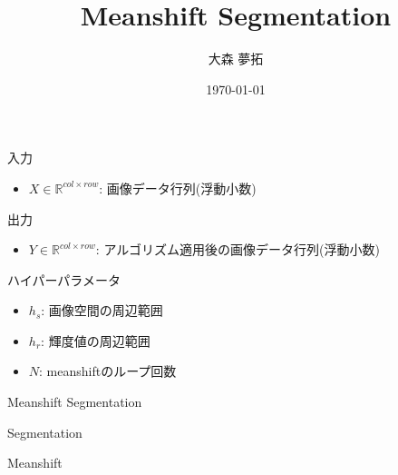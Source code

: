 \documentclass[a4paper]{ujarticle} %
\title{Meanshift Segmentation} %
\date{\today}
\author{大森 夢拓}
\begin{document}
	入力
	\begin{itemize}
		\item $X \in \mathbb{R}^{col \times row}$: 画像データ行列(浮動小数)
	\end{itemize}
	出力
	\begin{itemize}
		\item $Y \in \mathbb{R}^{col \times row}$: アルゴリズム適用後の画像データ行列(浮動小数)
	\end{itemize}
	ハイパーパラメータ
	\begin{itemize}
		\item $h_s$: 画像空間の周辺範囲
		\item $h_r$: 輝度値の周辺範囲
		\item $N$: meanshiftのループ回数
	\end{itemize}

	\begin{algorithm}[H]
		\caption{Meanshift Segmentation}
		\label{alg:mss}
		\begin{algorithmic}[1]
			\EndFunction
		\end{algorithmic}
	\end{algorithm}
	
	\begin{algorithm}[H]
		\caption{Segmentation}
		\label{alg:s}
		\begin{algorithmic}[1]
						 
					\EndFor
				\EndFor
			\EndFunction
		\end{algorithmic}
	\end{algorithm}

	\begin{algorithm}[H]
		\caption{Meanshift}
		\label{alg:ms}
		\begin{algorithmic}[1]
			 
				 
					 
					\EndIf
				\EndFor
			\EndFunction
		\end{algorithmic}
	\end{algorithm}
\end{document}
